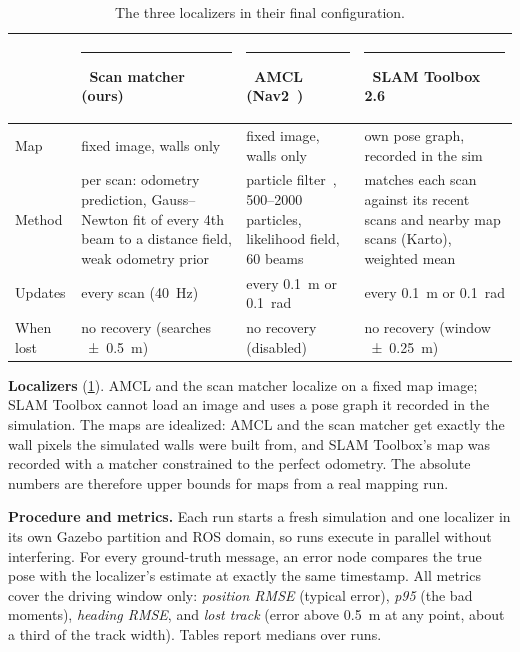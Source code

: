 \documentclass[10pt,letterpaper]{article}
\newcommand{\swatch}[1]{\textcolor{#1}{\rule[0.05em]{0.7em}{0.7em}}}
\begin{document}
\begin{table}[htbp]
  \centering\small
  \caption{The three localizers in their final configuration.}
  \label{tab:localizers}
  \begin{tabularx}{\linewidth}{@{}>{\raggedright\arraybackslash}p{1.6cm}>{\raggedright\arraybackslash}X
                                >{\raggedright\arraybackslash}X>{\raggedright\arraybackslash}X@{}}
    \toprule
    & \swatch{scan}~Scan matcher (ours) & \swatch{amcl}~AMCL (Nav2~\cite{macenski2020marathon}) &
      \swatch{slam}~SLAM Toolbox 2.6~\cite{macenski2021slam} \\
    \midrule
    Map & fixed image, walls only & fixed image, walls only & own pose graph, recorded in the sim \\
    Method & per scan: odometry prediction, Gauss--Newton fit of every 4th beam to a distance field,
        weak odometry prior & particle filter~\cite{thrun2005probabilistic,fox2003kld}, 500--2000
        particles, likelihood field, 60 beams & matches each scan against its recent scans and nearby
        map scans (Karto), weighted mean \\
    Updates & every scan (\SI{40}{Hz}) & every \SI{0.1}{m} or \SI{0.1}{rad} & every \SI{0.1}{m} or
        \SI{0.1}{rad} \\
    When lost & no recovery (searches \SI{\pm0.5}{m}) & no recovery (disabled) & no recovery (window
        \SI{\pm0.25}{m}) \\
    \bottomrule
  \end{tabularx}
\end{table}

\textbf{Localizers} (\cref{tab:localizers}). AMCL and the scan matcher localize on a fixed map image;
SLAM Toolbox cannot load an image and uses a pose graph it recorded in the simulation. The maps are
idealized: AMCL and the scan matcher get exactly the wall pixels the simulated walls were built from,
and SLAM Toolbox's map was recorded with a matcher constrained to the perfect odometry. The absolute
numbers are therefore upper bounds for maps from a real mapping run.

\textbf{Procedure and metrics.} Each run starts a fresh simulation and one localizer in its own
Gazebo partition and ROS domain, so runs execute in parallel without interfering. For every
ground-truth message, an error node compares the true pose with the localizer's estimate at exactly
the same timestamp. All metrics cover the driving window only: \emph{position RMSE} (typical error),
\emph{p95} (the bad moments), \emph{heading RMSE}, and \emph{lost track} (error above \SI{0.5}{m} at
any point, about a third of the track width). Tables report medians over runs.
\end{document}
